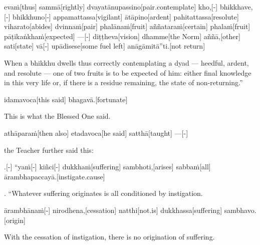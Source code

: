 \begin{samepage}
\begingl[glneveryline={\PaliGlossA,\PaliGlossB}]
evaṁ[thus] sammā[rightly] dvayatānupassino[pair.contemplate] kho,[-] bhikkhave,[-] bhikkhuno[-] appamattassa[vigilant] ātāpino[ardent] pahitattassa[resolute] viharato[abides] dvinnaṁ[pair] phalānaṁ[fruit] aññataraṁ[certain] phalaṁ[fruit] pāṭikaṅkhaṁ[expected] —[-] diṭṭheva[vision] dhamme[the Norm] aññā,[other] sati[state] vā[-] upādisese[some fuel left] anāgāmitā”ti.[not return]
\endgl
\nopagebreak
\linespread{0.5}
\begin{spacin}{0.2}
{\PaliGlossFT When a bhikkhu dwells thus correctly contemplating a dyad — heedful, ardent, and resolute — one of two fruits is to be expected of him: either final knowledge in this very life or, if there is a residue remaining, the state of non-returning.”}
\end{spacin}
\vskip 12pt
\end{samepage}
\begin{samepage}
\begingl[glneveryline={\PaliGlossA,\PaliGlossB}]
idamavoca[this said] bhagavā.[fortunate]
\endgl
\nopagebreak
\linespread{0.5}
\begin{spacin}{0.2}
{\PaliGlossFT This is what the Blessed One said.}
\end{spacin}
\vskip 12pt
\end{samepage}
\begin{samepage}
\begingl[glneveryline={\PaliGlossA,\PaliGlossB}]
athāparaṁ[then also] etadavoca[he said] satthā[taught] —[-]
\endgl
\nopagebreak
\linespread{0.5}
\begin{spacin}{0.2}
{\PaliGlossFT the Teacher further said this:}
\end{spacin}
\vskip 12pt
\end{samepage}
\vskip 0.2in
\begin{samepage}
.[-] “yaṁ[-] kiñci[-] dukkhaṁ[suffering] sambhoti,[arises] sabbaṁ[all] ārambhapaccayā.[instigate.cause]
\endgl
\nopagebreak
\linespread{0.5}
\begin{spacin}{0.2}
{. “Whatever suffering originates  is all conditioned by instigation.}
\end{spacin}
\vskip 12pt
\end{samepage}
\begin{samepage}
\begingl[glneveryline={\PaliGlossA,\PaliGlossB}]
ārambhānaṁ[-] nirodhena,[cessation] natthi[not.is] dukkhassa[suffering] sambhavo.[origin]
\endgl
\nopagebreak
\linespread{0.5}
\begin{spacin}{0.2}
{\PaliGlossFT With the cessation of instigation, there is no origination of suffering.}
\end{spacin}
\vskip 12pt
\end{samepage}
